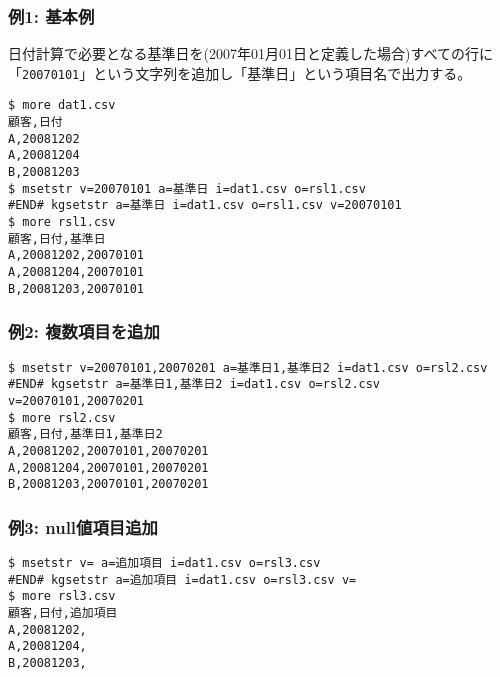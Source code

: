 \subsubsection*{例1: 基本例}

日付計算で必要となる基準日を(2007年01月01日と定義した場合)すべての行に「\verb|20070101|」という文字列を追加し「基準日」という項目名で出力する。


\begin{Verbatim}[baselinestretch=0.7,frame=single]
$ more dat1.csv
顧客,日付
A,20081202
A,20081204
B,20081203
$ msetstr v=20070101 a=基準日 i=dat1.csv o=rsl1.csv
#END# kgsetstr a=基準日 i=dat1.csv o=rsl1.csv v=20070101
$ more rsl1.csv
顧客,日付,基準日
A,20081202,20070101
A,20081204,20070101
B,20081203,20070101
\end{Verbatim}
\subsubsection*{例2: 複数項目を追加}



\begin{Verbatim}[baselinestretch=0.7,frame=single]
$ msetstr v=20070101,20070201 a=基準日1,基準日2 i=dat1.csv o=rsl2.csv
#END# kgsetstr a=基準日1,基準日2 i=dat1.csv o=rsl2.csv v=20070101,20070201
$ more rsl2.csv
顧客,日付,基準日1,基準日2
A,20081202,20070101,20070201
A,20081204,20070101,20070201
B,20081203,20070101,20070201
\end{Verbatim}
\subsubsection*{例3: null値項目追加}



\begin{Verbatim}[baselinestretch=0.7,frame=single]
$ msetstr v= a=追加項目 i=dat1.csv o=rsl3.csv
#END# kgsetstr a=追加項目 i=dat1.csv o=rsl3.csv v=
$ more rsl3.csv
顧客,日付,追加項目
A,20081202,
A,20081204,
B,20081203,
\end{Verbatim}
